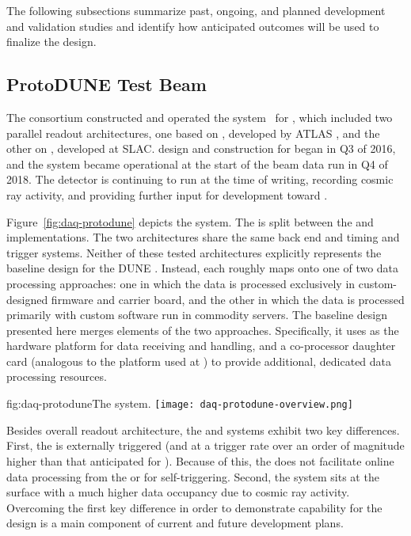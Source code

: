 The following subsections summarize past, ongoing, and planned
development and validation studies and identify how anticipated outcomes
will be used to finalize the  design.

\subsection{ProtoDUNE Test Beam}

\label{sec:daq:protodune}

The   consortium constructed and operated the  system~\cite{Sipos:2018auh} 
for , which included two parallel  readout architectures, one based on , 
developed by ATLAS \cite{atlas-felix}, and the other on , developed at SLAC.  design and construction for
 began in Q3 of 2016, and the system became operational at the start of the beam data run in Q4 of 2018. 
The detector is continuing to run at the time of writing, recording cosmic ray activity, and providing further input for 
 development toward . 

Figure~\ref{fig:daq-protodune} depicts the   system. 
The  is split between the  and 
\cite{bib:docdb1881} implementations. The two architectures share the
same back end and timing and trigger systems.  
Neither of these tested architectures explicitly represents the baseline design for the DUNE . Instead, each roughly maps onto one of two data processing approaches: one in which the data is processed exclusively in custom-designed  firmware and carrier board, and the other in which the data is processed primarily with custom software run in commodity servers. The baseline design presented here merges elements of the two approaches. Specifically, it uses  as the hardware platform for data receiving and handling, and a co-processor  daughter card (analogous to the  platform used at ) to provide additional, dedicated data processing resources.


\begin{dunefigure}{fig:daq-protodune}{The   system.}
 \texttt{[image: daq-protodune-overview.png]}
\end{dunefigure}

Besides overall readout architecture, the  and   systems exhibit two key differences. 
First, the   is externally triggered (and at a trigger rate over an order of magnitude higher than that anticipated for ). Because of this, the   does not facilitate online data processing from the  or  for self-triggering. 
Second, the  system sits at the surface with a much higher data occupancy due to cosmic ray activity.
Overcoming the first key difference in order to demonstrate
 capability for the   design is a
main component of current and future  development plans.


